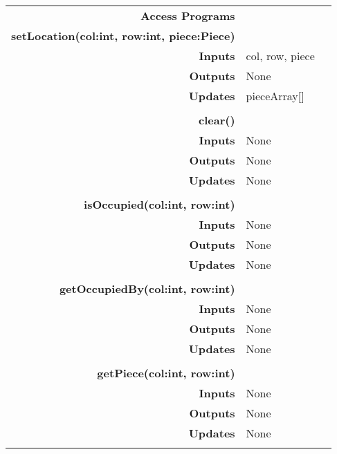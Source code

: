 \documentclass[10pt]{article}
\begin{document}
\begin{tabularx}{\linewidth}{ >{\bfseries}r Xp{5cm} }
            Access Programs & \begin{tabular}[t]{@{} l l p{8cm}} 
                                     & \\
                                    \bf{setLocation(col:int, row:int, piece:Piece)} & \\
                                    Inputs &  col, row, piece\\
                                    Outputs & None \\
                                    Updates & pieceArray[] \\ 
                                     & \\
                                    \bf{clear()} & \\
                                    Inputs & None \\
                                    Outputs & None \\
                                    Updates & None \\
                                     & \\
                                    \bf{isOccupied(col:int, row:int)} & \\
                                    Inputs & None \\
                                    Outputs & None \\
                                    Updates & None \\ 
                                     & \\
                                    \bf{getOccupiedBy(col:int, row:int)} & \\
                                    Inputs & None \\
                                    Outputs & None \\
                                    Updates & None \\
                                     & \\
                                    \bf{getPiece(col:int, row:int)} & \\
                                    Inputs & None \\
                                    Outputs & None \\
                                    Updates & None \\                                     
                              \end{tabular} \\
                              
        \end{tabularx}
        

        
\end{document}
